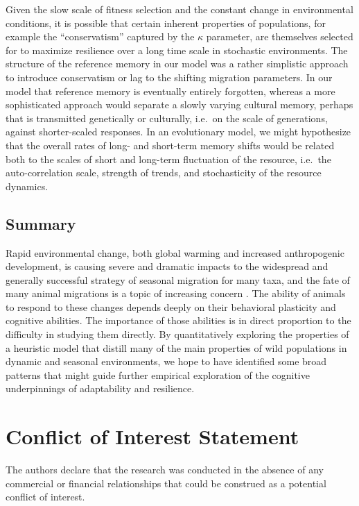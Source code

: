 \documentclass[utf8]{frontiersSCNS} %
\begin{document}
	Given the slow scale of fitness selection and the constant change in environmental conditions, it is possible that certain inherent properties of populations, for example the ``conservatism'' captured by the $\kappa$ parameter, are themselves selected for to maximize resilience over a long time scale in stochastic environments.  The structure of the reference memory in our model was a rather simplistic approach to introduce conservatism or lag to the shifting migration parameters. In our model that reference memory is eventually entirely forgotten, whereas a more sophisticated approach would separate a slowly varying cultural memory, perhaps that is transmitted genetically or culturally, i.e.~on the scale of generations, against shorter-scaled responses.  In an evolutionary model, we might hypothesize that the overall rates of long- and short-term memory shifts would be related both to the scales of short and long-term fluctuation of the resource, i.e.~the auto-correlation scale, strength of trends, and stochasticity of the resource dynamics.  \\
		
\subsection{Summary}
	
	Rapid environmental change, both global warming and increased anthropogenic development, is causing severe and dramatic impacts to the widespread and generally successful strategy of seasonal migration for many taxa, and the fate of many animal migrations is a topic of increasing concern \citep{Wilcove2008, Kauffman2021}. The ability of animals to respond to these changes depends deeply on their behavioral plasticity and cognitive abilities. The importance of those abilities is in direct proportion to the difficulty in studying them directly.	By quantitatively exploring the properties of a heuristic model that distill many of the main properties of wild populations in dynamic and seasonal environments, we hope to have identified some broad patterns that might guide further empirical exploration of the cognitive underpinnings of adaptability and resilience.	

	\section*{Conflict of Interest Statement}
	
	The authors declare that the research was conducted in the absence of any commercial or financial relationships that could be construed as a potential conflict of interest.
	
\end{document}
